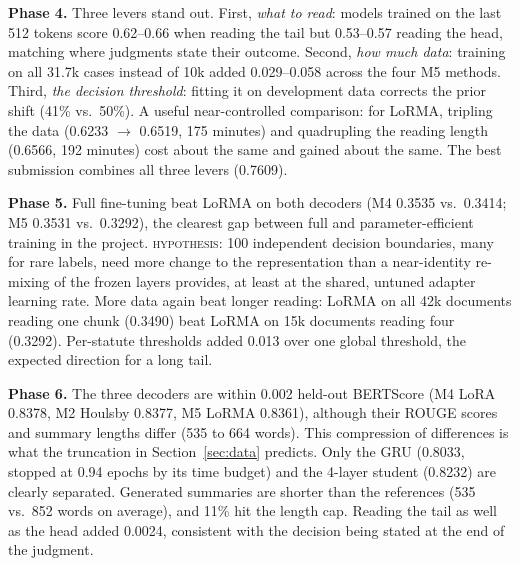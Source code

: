 \documentclass[11pt, oneside]{article}
\newcommand{\hyp}{\textsc{hypothesis}}
\begin{document}
\textbf{Phase 4.} Three levers stand out. First, \emph{what to read}: models trained on the last 512 tokens score
0.62--0.66 when reading the tail but 0.53--0.57 reading the head, matching where judgments state their outcome.
Second, \emph{how much data}: training on all 31.7k cases instead of 10k added 0.029--0.058 across the four M5
methods. Third, \emph{the decision threshold}: fitting it on development data corrects the prior shift (41\% vs.\
50\%). A useful near-controlled comparison: for LoRMA, tripling the data (0.6233 $\to$ 0.6519, 175 minutes) and
quadrupling the reading length (0.6566, 192 minutes) cost about the same and gained about the same. The best submission
combines all three levers (0.7609).

\textbf{Phase 5.} Full fine-tuning beat LoRMA on both decoders (M4 0.3535 vs.\ 0.3414; M5 0.3531 vs.\ 0.3292), the
clearest gap between full and parameter-efficient training in the project. \hyp: 100 independent decision
boundaries, many for rare labels, need more change to the representation than a near-identity re-mixing of the
frozen layers provides, at least at the shared, untuned adapter learning rate. More data again beat longer reading:
LoRMA on all 42k documents reading one chunk (0.3490) beat LoRMA on 15k documents reading four (0.3292). Per-statute
thresholds added 0.013 over one global threshold, the expected direction for a long tail.

\textbf{Phase 6.} The three decoders are within 0.002 held-out BERTScore (M4 LoRA 0.8378, M2 Houlsby 0.8377,
M5 LoRMA 0.8361), although their ROUGE scores and summary lengths differ (535 to 664 words). This compression of
differences is what the truncation in Section~\ref{sec:data} predicts. Only the GRU (0.8033, stopped at 0.94 epochs by
its time budget) and the 4-layer student (0.8232) are clearly separated. Generated summaries are shorter than the
references (535 vs.\ 852 words on average), and 11\% hit the length cap. Reading the tail as well as the head added
0.0024, consistent with the decision being stated at the end of the judgment.
\end{document}
